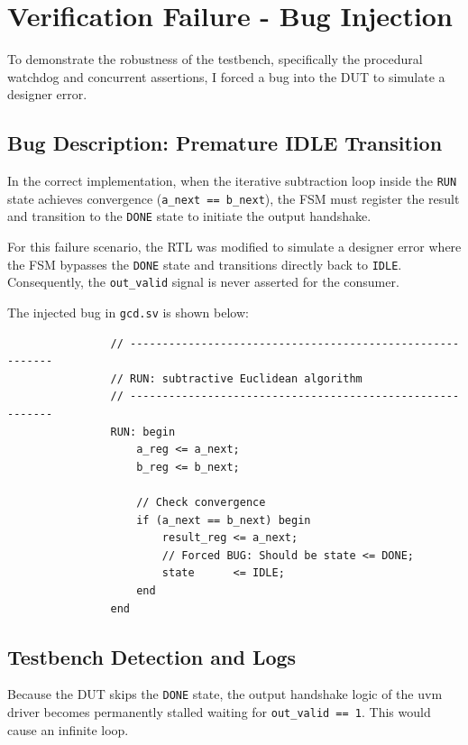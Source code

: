 \newpage
\section{Verification Failure - Bug Injection}

To demonstrate the robustness of the testbench, specifically the procedural watchdog and concurrent assertions, I forced a bug into the DUT to simulate a designer error.

\subsection{Bug Description: Premature IDLE Transition}
In the correct implementation, when the iterative subtraction loop inside the \texttt{RUN} state achieves convergence (\texttt{a\_next == b\_next}), the FSM must register the result and transition to the \texttt{DONE} state to initiate the output handshake. 

For this failure scenario, the RTL was modified to simulate a designer error where the FSM bypasses the \texttt{DONE} state and transitions directly back to \texttt{IDLE}. Consequently, the \texttt{out\_valid} signal is never asserted for the consumer. 

The injected bug in \texttt{gcd.sv} is shown below:

\begin{verbatim}
                // ----------------------------------------------------------
                // RUN: subtractive Euclidean algorithm
                // ----------------------------------------------------------
                RUN: begin
                    a_reg <= a_next;
                    b_reg <= b_next;

                    // Check convergence
                    if (a_next == b_next) begin
                        result_reg <= a_next;
                        // Forced BUG: Should be state <= DONE;
                        state      <= IDLE; 
                    end
                end
\end{verbatim}

\subsection{Testbench Detection and Logs}
Because the DUT skips the \texttt{DONE} state, the output handshake logic of the uvm driver becomes permanently stalled waiting for \texttt{out\_valid == 1}. This would cause an infinite loop.

